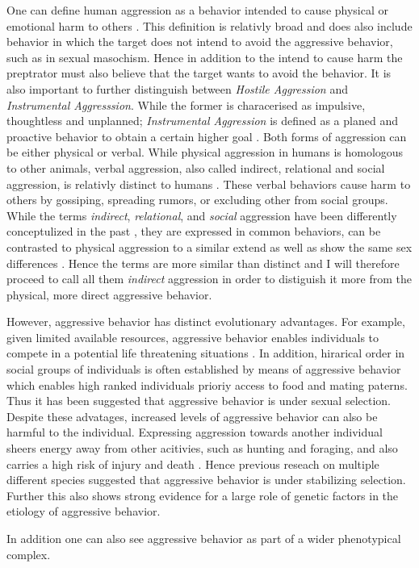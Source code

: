 One can define human aggression as a behavior intended to cause physical or emotional harm to others \cite{Anderson2002}.
This definition is relativly broad and does also include behavior in which the target does not intend to avoid the aggressive behavior, such as in sexual masochism.
Hence in addition to the intend to cause harm the preptrator must also believe that the target wants to avoid the behavior\cite{Berkowitz1993,Baumeister1989,Baron2007,Geen2001}.  
It is also important to further distinguish between \textit{Hostile Aggression} and \textit{Instrumental Aggresssion}.
While the former is characerised as impulsive, thoughtless and unplanned; \textit{Instrumental Aggression} is defined as a planed and proactive behavior to obtain a certain higher goal \cite{Berkowitz1993,Geen2001}.
Both forms of aggression can be either physical or verbal.
While physical aggression in humans is homologous to other animals, verbal aggression, also called indirect, relational and social aggression, is relativly distinct to humans \cite{Archer2005}.
These verbal behaviors cause harm to others by gossiping, spreading rumors, or excluding other from social groups.
While the terms \textit{indirect}, \textit{relational}, and \textit{social} aggression have been differently conceptulized in the past \cite{Archer2001}, they are expressed in common behaviors, can be contrasted to physical aggression to a similar extend as well as show the same sex differences \cite{Archer2004}.
Hence the terms are more similar than distinct and I will therefore proceed to call all them \textit{indirect} aggression in order to distiguish it more from the physical, more direct aggressive behavior.




However, aggressive behavior has distinct evolutionary advantages.
For example, given limited available resources, aggressive behavior enables individuals to compete in a potential life threatening situations \cite[]{Anholt2012}.
In addition, hirarical order in social groups of individuals is often established by means of aggressive behavior which enables high ranked individuals prioriy access to food and mating paterns. 
Thus it has been suggested that aggressive behavior is under sexual selection\cite{Lindenfors2011}.
Despite these advatages, increased levels of aggressive behavior can also be harmful to the individual.
Expressing aggression towards another individual sheers energy away from other acitivies, such as hunting and foraging, and also carries a high risk of injury and death \cite{Packer1995}.  
Hence previous reseach on multiple different species suggested that aggressive behavior is under stabilizing selection.
Further this also shows strong evidence for a large role of genetic factors in the etiology of aggressive behavior. 


In addition one can also see aggressive behavior as part of a wider phenotypical complex. 


